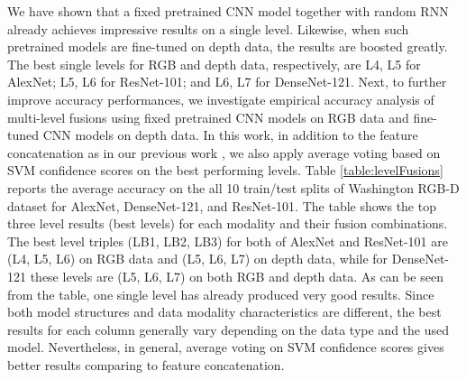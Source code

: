 \documentclass[10pt,journal,compsoc]{IEEEtran}
\begin{document}
We have shown that a fixed pretrained CNN model together with random RNN already achieves impressive results on a single level. Likewise, when such pretrained models are fine-tuned on depth data, the results are boosted greatly. The best single levels for RGB and depth data, respectively, are L4, L5 for AlexNet; L5, L6 for ResNet-101; and  L6, L7 for DenseNet-121. Next, to further improve accuracy performances, we investigate empirical accuracy analysis of multi-level fusions using fixed pretrained CNN models on RGB data and fine-tuned CNN models on depth data. In this work, in addition to the feature concatenation as in our previous work \cite{Caglayan_ECCVW_2018}, we also apply average voting based on SVM confidence scores on the best performing levels. Table \ref{table:levelFusions} reports the average accuracy on the all 10 train/test splits of Washington RGB-D dataset for AlexNet, DenseNet-121, and ResNet-101. The table shows the top three level results (best levels) for each modality and their fusion combinations. The best level triples (LB1, LB2, LB3) for both of AlexNet and ResNet-101 are (L4, L5, L6) on RGB data and (L5, L6, L7) on depth data, while for DenseNet-121 these levels are (L5, L6, L7) on both RGB and depth data. As can be seen from the table, one single level has already produced very good results. Since both model structures and data modality characteristics are different, the best results for each column generally vary depending on the data type and the used model. Nevertheless, in general, average voting on SVM confidence scores gives better results comparing to feature concatenation. 
\end{document}
